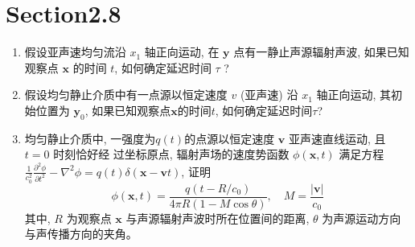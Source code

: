 \section*{Section2.8}

\begin{enumerate}
    \item 假设亚声速均匀流沿 \( x_{1} \) 轴正向运动, 
    在 \( \boldsymbol{y} \) 点有一静止声源辐射声波, 
    如果已知观察点 \( \boldsymbol{x} \) 的时间 \(t\),
    如何确定延迟时间 \( \tau \) ?
    
    
    \item  假设均匀静止介质中有一点源以恒定速度 \(v\) (亚声速) 沿 \( x_{1} \) 轴正向运动,
    其初始位置为 \( \boldsymbol{y}_{0} \), 
    如果已知观察点\( \boldsymbol{x} \)的时间\(t\), 如何确定延迟时间\( \tau \)?
    
    
    \item 均匀静止介质中, 一强度为\( q(t) \)的点源以恒定速度 \( \boldsymbol{v} \) 亚声速直线运动, 
    且 \( t=0 \) 时刻恰好经 过坐标原点, 辐射声场的速度势函数 \( \phi(\boldsymbol{x}, t) \) 满足方程
    \( \frac{1}{c_{0}^{2}} \frac{\partial^{2} \phi}{\partial t^{2}}-\nabla^{2} \phi=q(t) \delta(\boldsymbol{x}-\boldsymbol{v} t) \), 
    证明
    \[
    \phi(\boldsymbol{x}, t)=\frac{q\left(t-R / c_{0}\right)}{4 \pi R(1-M \cos \theta)}, \quad M=\frac{|\boldsymbol{v}|}{c_{0}}
    \]
    其中, \( R \) 为观察点 \( \boldsymbol{x} \) 与声源辐射声波时所在位置间的距离, \(\theta \) 为声源运动方向与声传播方向的夹角。
\end{enumerate}

\clearpage